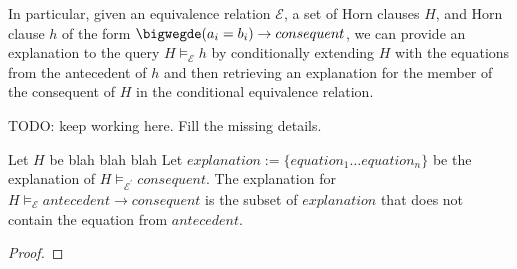 In particular, given an equivalence relation $\mathcal{E}$, a 
set of Horn clauses $H$, and Horn clause $h$ of the form 
$\bigwegde (a_i = b_i) \rightarrow consequent$, we can 
provide an explanation to the query $H \models_{\mathcal{E}} h$
by conditionally extending $H$ with the equations
from the antecedent of $h$ and then retrieving an explanation
for the member of the consequent of $H$ in the conditional 
equivalence relation.

TODO: keep working here. Fill the missing details.
\begin{lemma}
  Let $H$ be blah blah blah
  Let $explanation := \{equation_1 \dots equation_n \}$ be the 
  explanation of $H \models_{\mathcal{E^{'}}} consequent$.
  The explanation for $H \models_{\mathcal{E}} antecedent 
  \rightarrow consequent$ is the subset of $explanation$
  that does not contain the equation from $antecedent$.
\end{lemma}

\begin{proof}
\end{proof} 

